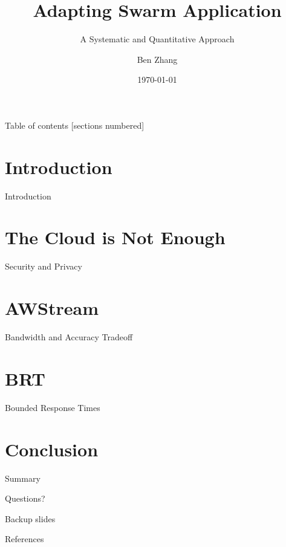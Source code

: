 \documentclass[10pt]{beamer}
\title{Adapting Swarm Application}
\subtitle{A Systematic and Quantitative Approach}
\date{\today}
\author{Ben Zhang}
\begin{document}
\maketitle

\begin{frame}{Table of contents}
  [sections numbered]
  \tableofcontents[hideallsubsections]
\end{frame}

\section{Introduction}

\begin{frame}{Introduction}

\end{frame}

\section{The Cloud is Not Enough}

\begin{frame}{Security and Privacy}

\end{frame}

\section{AWStream}

\begin{frame}{Bandwidth and Accuracy Tradeoff}

\end{frame}

\section{BRT}

\begin{frame}{Bounded Response Times}

\end{frame}



\section{Conclusion}

\begin{frame}{Summary}

\end{frame}

\begin{frame}[standout]

  Questions?

\end{frame}

\appendix

\begin{frame}[fragile]{Backup slides}

\end{frame}

\begin{frame}[allowframebreaks]{References}

  
  

\end{frame}
\end{document}
